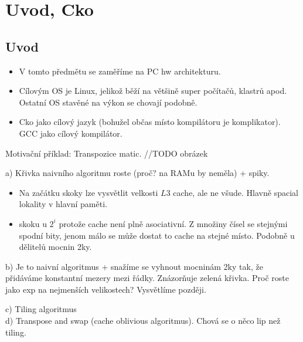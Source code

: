 \section{\texorpdfstring{Uvod, Cko}{Uvod, Cko}}
\vspace{5mm}
\large

\subsection{Uvod}

\begin{itemize}
	\item V tomto předmětu se zaměříme na PC hw architekturu.
	\item Cílovým OS je Linux, jelikož běží na většině super počítačů, klastrů apod.
		Ostatní OS stavěné na výkon se chovají podobně.
	\item Cko jako cílový jazyk (bohužel občas místo kompilátoru je komplikator).
		GCC jako cílový kompilátor.
\end{itemize}

\begin{example}
	Motivační příklad: Transpozice matic.
	//TODO obrázek

	a) Křivka naivního algoritmu roste (proč? na RAMu by neměla) + spiky.
	\begin{itemize}
		\item Na začátku skoky lze vysvětlit velkosti $L3$ cache, ale ne všude.
			Hlavně spacial lokality v hlavní paměti.
		\item skoku u $2^i$ protože cache není plně asociativní.
			Z množiny čísel se stejnými spodní bity, jenom málo se může dostat to cache na stejné místo.
			Podobně u dělitelů mocnin 2ky.
	\end{itemize}
	b) Je to naivní algoritmus + snažíme se vyhnout mocninám 2ky tak, že přidáváme konstantní mezery mezi řádky.
	Znázorňuje zelená křivka.
	Proč roste jako exp na nejmenších velikostech? Vysvětlíme později.

	c) Tiling algoritmus \\
	d) Transpose and swap (cache oblivious algoritmus).
	Chová se o něco lip než tiling.

\end{example}

